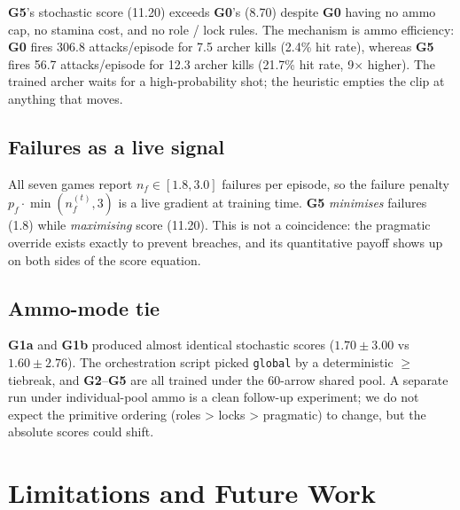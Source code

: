 \documentclass[11pt,a4paper]{article}
\newcommand{\gz}{\textbf{G0}}
\newcommand{\ga}{\textbf{G1a}}
\newcommand{\gb}{\textbf{G1b}}
\newcommand{\gii}{\textbf{G2}}
\newcommand{\gv}{\textbf{G5}}
\begin{document}
\gv{}'s stochastic score (11.20) exceeds \gz{}'s (8.70) despite \gz{}
having no ammo cap, no stamina cost, and no role / lock rules. The
mechanism is ammo efficiency: \gz{} fires 306.8 attacks/episode for 7.5
archer kills (2.4\% hit rate), whereas \gv{} fires 56.7 attacks/episode
for 12.3 archer kills (21.7\% hit rate, 9$\times$ higher). The trained
archer waits for a high-probability shot; the heuristic empties the
clip at anything that moves.

\subsection{Failures as a live signal}

All seven games report $n_f \in [1.8, 3.0]$ failures per episode, so the
failure penalty $p_f \cdot \min(n_f^{(t)}, 3)$ is a live gradient at
training time. \gv{} \emph{minimises} failures (1.8) while
\emph{maximising} score (11.20). This is not a coincidence: the
pragmatic override exists exactly to prevent breaches, and its
quantitative payoff shows up on both sides of the score equation.

\subsection{Ammo-mode tie}

\ga{} and \gb{} produced almost identical stochastic scores
($1.70 \pm 3.00$ vs $1.60 \pm 2.76$). The orchestration script picked
\texttt{global} by a deterministic $\ge$ tiebreak, and
\gii--\gv{} are all trained under the 60-arrow shared pool. A separate
run under individual-pool ammo is a clean follow-up experiment; we do
not expect the primitive ordering (roles > locks > pragmatic) to
change, but the absolute scores could shift.

\section{Limitations and Future Work}
\label{sec:future}
\end{document}
